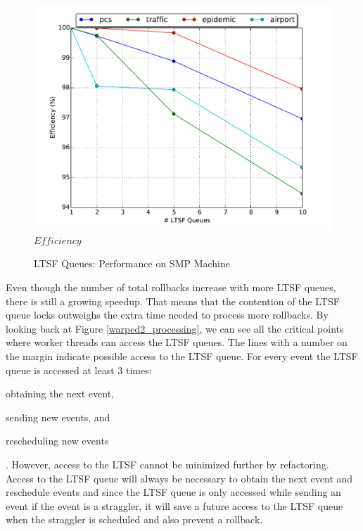 \documentclass[11pt]{book}
\begin{document}
\begin{figure}
\begin{minipage}{.5\textwidth}
\begin{center}
      \includegraphics[width=\textwidth,keepaspectratio,quiet]{figs/pending_event_set/ltsf_efficiency.pdf} \\
      $Efficiency$ \\
    \end{center}
  \end{minipage}
  \caption{LTSF Queues: Performance on SMP Machine}\label{ltsf_analysis}
\end{figure}

Even though the number of total rollbacks increase with more LTSF queues, there is still a growing
speedup.  That means that the contention of the LTSF queue locks outweighs the extra time needed to
process more rollbacks.  By looking back at Figure \ref{warped2_processing}, we can see all the
critical points where worker threads can access the LTSF queues.  The lines with a number on the
margin indicate possible access to the LTSF queue.  For every event the LTSF queue is accessed at
least 3 times: \begin{inparaenum}[(1)] \item obtaining the next event, \item sending new events,
  and \item rescheduling new events \end{inparaenum}.  However, access to the LTSF cannot be
minimized further by refactoring.  Access to the LTSF queue will always be necessary to obtain the
next event and reschedule events and since the LTSF queue is only accessed while sending an event if
the event is a straggler, it will save a future access to the LTSF queue when the straggler is
scheduled and also prevent a rollback.
\end{document}
